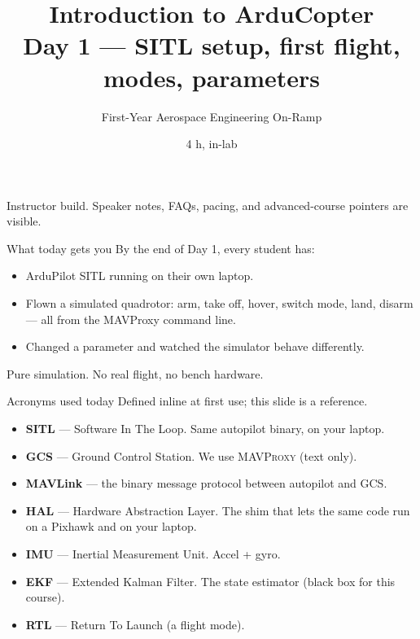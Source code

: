 \documentclass[aspectratio=169,11pt]{beamer}
\title{Introduction to ArduCopter\\\large Day 1 --- SITL setup, first flight, modes, parameters}
\subtitle{First-Year Aerospace Engineering On-Ramp}
\date{4 h, in-lab}
\author{}
\institute{\copyrightline}
\begin{document}
\begin{frame}
  \titlepage
  \ifinstructor
    \footnotesize Instructor build. Speaker notes, FAQs, pacing, and advanced-course pointers are visible.
  \fi
\end{frame}

\begin{frame}{What today gets you}
  By the end of Day 1, every student has:
  \begin{itemize}
    \item ArduPilot SITL running on their own laptop.
    \item Flown a simulated quadrotor: arm, take off, hover, switch mode, land, disarm --- all from the MAVProxy command line.
    \item Changed a parameter and watched the simulator behave differently.
  \end{itemize}
  \vfill
  Pure simulation. No real flight, no bench hardware.
\end{frame}

\begin{frame}{Acronyms used today}
  Defined inline at first use; this slide is a reference.
  \begin{itemize}
    \item \textbf{SITL} --- Software In The Loop. Same autopilot binary, on your laptop.
    \item \textbf{GCS} --- Ground Control Station. We use \textsc{MAVProxy} (text only).
    \item \textbf{MAVLink} --- the binary message protocol between autopilot and GCS.
    \item \textbf{HAL} --- Hardware Abstraction Layer. The shim that lets the same code run on a Pixhawk and on your laptop.
    \item \textbf{IMU} --- Inertial Measurement Unit. Accel + gyro.
    \item \textbf{EKF} --- Extended Kalman Filter. The state estimator (black box for this course).
    \item \textbf{RTL} --- Return To Launch (a flight mode).
  \end{itemize}
\end{frame}

\end{document}
